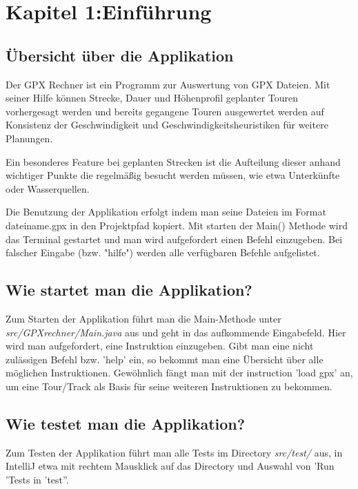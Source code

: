 \section{Kapitel 1:Einführung}


\subsection{Übersicht über die Applikation}

Der GPX Rechner ist ein Programm zur Auswertung von GPX Dateien. Mit seiner Hilfe können Strecke, Dauer und Höhenprofil geplanter Touren vorhergesagt werden und bereits gegangene Touren ausgewertet werden auf Konsistenz der Geschwindigkeit und Geschwindigkeitsheuristiken für weitere Planungen.

Ein besonderes Feature bei geplanten Strecken ist die Aufteilung dieser anhand wichtiger Punkte die regelmäßig besucht werden müssen, wie etwa Unterkünfte oder Wasserquellen.

Die Benutzung der Applikation erfolgt indem man seine Dateien im Format dateiname.gpx in den Projektpfad kopiert. Mit starten der Main() Methode wird das Terminal gestartet und man wird aufgefordert einen Befehl einzugeben. Bei falscher Eingabe (bzw. "hilfe") werden alle verfügbaren Befehle aufgelistet.



\subsection{Wie startet man die Applikation?}

Zum Starten der Applikation führt man die Main-Methode unter \textit{src/GPXrechner/Main.java} aus und geht in das aufkommende Eingabefeld. Hier wird man aufgefordert, eine Instruktion einzugeben. Gibt man eine nicht zulässigen Befehl bzw. 'help' ein, so bekommt man eine Übersicht über alle möglichen Instruktionen. Gewöhnlich fängt man mit der instruction 'load gpx' an, um eine Tour/Track als Basis für seine weiteren Instruktionen zu bekommen.


\subsection{Wie testet man die Applikation?}

Zum Testen der Applikation führt man alle Tests im Directory \textit{src/test/} aus, in IntelliJ etwa mit rechtem Mausklick auf das Directory und Auswahl von 'Run 'Tests in 'test''.